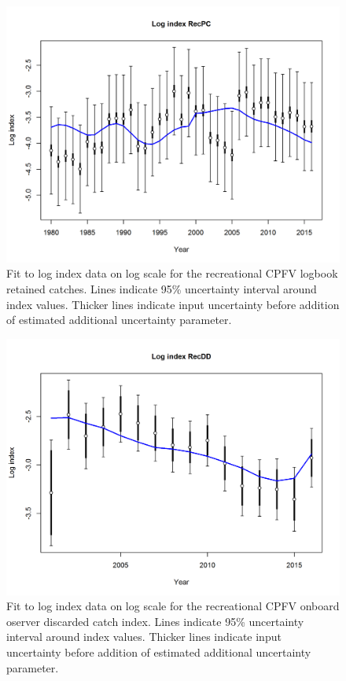 \documentclass[12pt,]{article}
\begin{document}
\FloatBarrier

\begin{figure}[htbp]
\centering
\includegraphics{r4ss/plots_mod1/index5_logcpuefit_RecPC.png}
\caption{Fit to log index data on log scale for the recreational CPFV
logbook retained catches. Lines indicate 95\% uncertainty interval
around index values. Thicker lines indicate input uncertainty before
addition of estimated additional uncertainty parameter.
\label{fig:RecPC_indexfit}}
\end{figure}

\FloatBarrier

\begin{figure}[htbp]
\centering
\includegraphics{r4ss/plots_mod1/index5_logcpuefit_RecDD.png}
\caption{Fit to log index data on log scale for the recreational CPFV
onboard oserver discarded catch index. Lines indicate 95\% uncertainty
interval around index values. Thicker lines indicate input uncertainty
before addition of estimated additional uncertainty parameter.
\label{fig:RecDD_indexfit}}
\end{figure}
\end{document}
